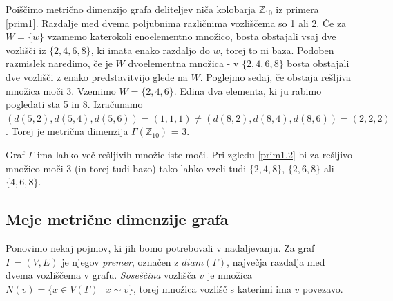 \documentclass[mat1, tisk]{fmfdelo}
\newcommand{\Z}{\mathbb Z}
\begin{document}
%
\begin{zgled}\label{prim1.2}
  Poiščimo metrično dimenzijo grafa deliteljev niča kolobarja $\Z_{10}$ iz 
  primera \ref{prim1}. Razdalje 
  med dvema poljubnima različnima vozliščema so 1 ali 2. Če za $W = \{w\}$ vzamemo 
  katerokoli enoelementno množico, bosta obstajali vsaj dve vozlišči iz 
  $\{2,4,6,8\}$, ki imata enako razdaljo do $w$, torej to ni baza. Podoben razmislek 
  naredimo, če je $W$ dvoelementna množica - v $\{2,4,6,8\}$ bosta obstajali dve 
  vozlišči z enako predstavitvijo glede na $W$. Poglejmo sedaj, če obstaja rešljiva 
  množica moči 3. Vzemimo $W = \{2,4,6\}$. Edina dva elementa, ki ju rabimo pogledati 
  sta 5 in 8. Izračunamo 
  $(d(5,2),d(5,4),d(5,6)) = (1,1,1) \neq (d(8,2),d(8,4),d(8,6)) = (2,2,2)$. Torej je 
  metrična dimenzija $\Gamma(\Z_{10})$ = 3.
\end{zgled}
%
\begin{opomba}
  Graf $\Gamma$ ima lahko več rešljivih množic iste moči. Pri zgledu \ref{prim1.2} 
  bi za rešljivo množico moči 3 (in torej tudi bazo) tako lahko vzeli tudi 
  $\{2,4,8\}$, $\{2,6,8\}$ ali $\{4,6,8\}$.
\end{opomba}
%
\subsection{Meje metrične dimenzije grafa}
%
Ponovimo nekaj pojmov, ki jih bomo potrebovali v nadaljevanju. Za graf 
$\Gamma = (V, E)$ je njegov \emph{premer}, označen z $diam(\Gamma)$, največja 
razdalja med dvema vozliščema v grafu. \emph{Soseščina} vozlišča $v$ je 
množica $N(v) = \{ x \in V(\Gamma)~|~x \sim v \}$, torej množica vozlišč 
s katerimi ima $v$ povezavo. 
\end{document}
